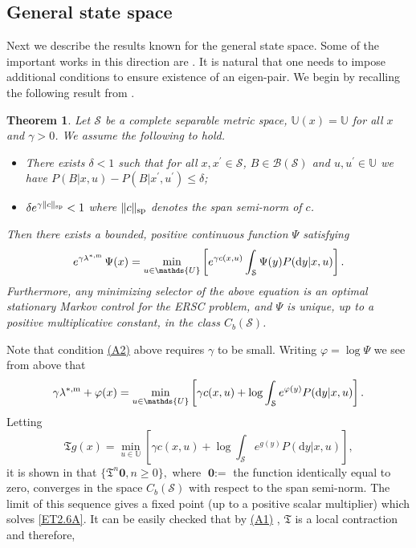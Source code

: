 \documentclass[notitlepage,11pt,reqno]{amsart}
\numberwithin{equation}{section}
\theoremstyle{plain}
\newtheorem{theorem}{Theorem}[section]
\theoremstyle{definition}
\theoremstyle{remark}
\newcommand{\Act}{{\mathds{U}}}
\newcommand{\sB}{{\mathscr{B}}}
\newcommand{\cS}{{\mathcal{S}}}     %
\newcommand{\lamstrdm}{\lambda^{*,{\rm m}}}
\newcommand{\D}{\mathrm{d}} %
\newcommand{\norm}[1]{\lVert#1\rVert}
\begin{document}
\subsection{General state space}
Next we describe the results known for the general state space. Some of the important works in this direction are
\cite{DiMasi-07,MR1829070,DiMasi-99b,Jaskiewicz-07}. It is natural that one needs to impose additional conditions to ensure
existence of an eigen-pair. We begin by recalling the following result from \cite{MR1829070}.
\begin{theorem}
Let $\cS$ be a complete separable metric space, $\Act(x)=\Act$ for all $x$ and $\gamma>0$. We assume the following to hold.
\begin{itemize}
\item[\hypertarget{A1}{(A1)}] There exists $\delta<1$ such that for all $x, x^\prime\in\cS$, $B\in\sB(\cS)$ and $u, u^\prime\in\Act$ we have
$P(B|x, u)-P(B|x^\prime, u^\prime)\leq \delta$;
\item[\hypertarget{A2}{(A2)}] $\delta e^{\gamma \norm{c}_{\rm sp}}<1$ where $\norm{c}_{\rm sp}$ denotes the span semi-norm of $c$.
\end{itemize}
Then there exists a bounded, positive continuous function $\Psi$ satisfying
\begin{equation}\label{ET2.6A}
e^{\gamma\lamstrdm}\, \Psi(x)=\min_{u\in\Act}\left[e^{\gamma c(x, u)}\int_{\cS} \Psi(y) P(\D{y}|x, u)\right].
\end{equation}
Furthermore, any minimizing selector of the above equation is an optimal stationary Markov control for the ERSC problem, and $\Psi$ is unique, up to a positive
multiplicative constant, in the class $C_b(\cS)$.
\end{theorem}
Note that condition \hyperlink{A2}{(A2)} above requires $\gamma$ to be small. Writing $\varphi=\log\Psi$ we see from above that
$$\gamma\lamstrdm + \varphi(x)= \min_{u\in\Act}\left[\gamma c(x, u)+ \log\int_{\cS} e^{\varphi(y)} P(\D{y}|x, u)\right].$$
Letting 
$$\mathfrak{T}g(x)=\min_{u\in\Act}\left[\gamma c(x, u)+ \log\int_{\cS} e^{g(y)} P(\D{y}|x, u)\right],$$
it is shown in \cite{MR1829070} that   $\{\mathfrak{T}^{n}\textbf{0}, n \geq 0\},$ where $\textbf{0} :=$ the function identically equal to zero,  converges in the space $C_b(\cS)$ with respect to the span semi-norm. The limit of this sequence
gives a fixed point (up to a positive scalar multiplier) which solves \eqref{ET2.6A}. It can be easily checked that by \hyperlink{A1}{(A1)} , $\mathfrak{T}$ is a local contraction \cite[Proposition~2.2]{DiMasi-99b} and therefore,
\end{document}
